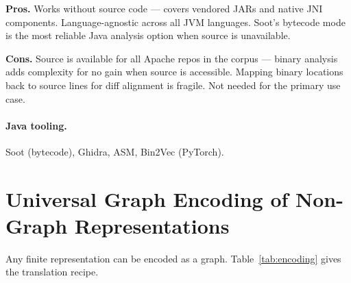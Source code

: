 \documentclass[12pt,a4paper]{article}
\begin{document}
\begin{prosbox}
\textbf{Pros.}
Works without source code --- covers vendored JARs and native JNI components.
Language-agnostic across all JVM languages. Soot's bytecode mode is the most
reliable Java analysis option when source is unavailable.
\end{prosbox}

\begin{consbox}
\textbf{Cons.}
Source is available for all Apache repos in the corpus --- binary analysis
adds complexity for no gain when source is accessible. Mapping binary locations
back to source lines for diff alignment is fragile. Not needed for the primary
use case.
\end{consbox}

\paragraph{Java tooling.} Soot (bytecode), Ghidra, ASM, Bin2Vec (PyTorch).

\section{Universal Graph Encoding of Non-Graph Representations}

Any finite representation can be encoded as a graph. Table~\ref{tab:encoding}
gives the translation recipe.
\end{document}
